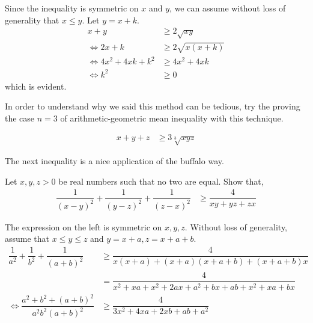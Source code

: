 \documentclass{subfile}
\begin{document}
		\begin{solution}
			Since the inequality is symmetric on $x$ and $y$, we can assume without loss of generality that $x\leq y$. Let $y=x+k$.
				\begin{align*}
					x+y
						& \geq2\sqrt{xy}\\
					\iff2x+k
						& \geq2\sqrt{x(x+k)}\\
					\iff4x^2+4xk+k^2
						& \geq4x^2+4xk\\
					\iff k^2
						& \geq0
				\end{align*}
			which is evident.
		\end{solution}
	In order to understand why we said this method can be tedious, try the proving the case $n=3$ of arithmetic-geometric mean inequality with this technique.
		\begin{problem}
			\begin{align*}
				x+y+z
					& \geq3\sqrt[3]{xyz}
			\end{align*}
		\end{problem}
	The next inequality is a nice application of the buffalo way.
		\begin{problem}
			Let $x,y,z>0$ be real numbers such that no two are equal. Show that,
				\begin{align*}
					\dfrac{1}{(x-y)^2}+\dfrac{1}{(y-z)^2}+\dfrac{1}{(z-x)^2}
						& \geq\dfrac{4}{xy+yz+zx}
				\end{align*}
		\end{problem}
	
		\begin{solution}
			The expression on the left is symmetric on $x,y,z$. Without loss of generality, assume that $x\leq y\leq z$ and $y=x+a,z=x+a+b$.
				\begin{align*}
					\dfrac{1}{a^2}+\dfrac{1}{b^2}+\dfrac{1}{(a+b)^2}
						& \geq\dfrac{4}{x(x+a)+(x+a)(x+a+b)+(x+a+b)x}\\
						& = \dfrac{4}{x^2+xa+x^2+2ax+a^2+bx+ab+x^2+xa+bx}\\
					\iff \dfrac{a^2+b^2+(a+b)^2}{a^2b^2(a+b)^2}
						& \geq \dfrac{4}{3x^2+4xa+2xb+ab+a^2}
				\end{align*}
			
		\end{solution}
\end{document}
